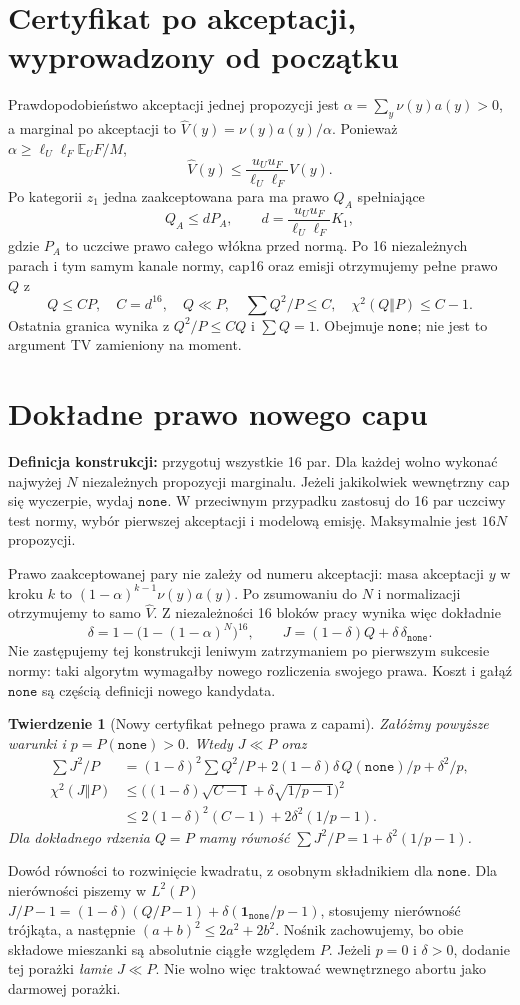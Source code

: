 \documentclass[11pt,a4paper]{article}
\newcommand{\none}{\mathtt{none}}
\newcommand{\E}{\mathbb E}
\newtheorem{theorem}{Twierdzenie}
\begin{document}
\section{Certyfikat po akceptacji, wyprowadzony od początku}
Prawdopodobieństwo akceptacji jednej propozycji jest
$\alpha=\sum_y\nu(y)a(y)>0$, a marginal po akceptacji to
$\widehat V(y)=\nu(y)a(y)/\alpha$.
Ponieważ $\alpha\ge\ell_U\ell_F\E_U F/M$,
\[
 \widehat V(y)\le\frac{u_Uu_F}{\ell_U\ell_F}V(y).
\]
Po kategorii $z_1$ jedna zaakceptowana para ma prawo $Q_A$ spełniające
\[
 Q_A\le dP_A,\qquad d=\frac{u_Uu_F}{\ell_U\ell_F}K_1,
\]
gdzie $P_A$ to uczciwe prawo całego włókna przed normą.
Po 16 niezależnych parach i tym samym kanale normy, cap16 oraz emisji
otrzymujemy pełne prawo $Q$ z
\[
 Q\le CP,\quad C=d^{16},\quad Q\ll P,\quad
 \sum Q^2/P\le C,\quad\chi^2(Q\Vert P)\le C-1.
\]
Ostatnia granica wynika z $Q^2/P\le CQ$ i $\sum Q=1$.
Obejmuje $\none$; nie jest to argument TV zamieniony na moment.

\section{Dokładne prawo nowego capu}
\textbf{Definicja konstrukcji:} przygotuj wszystkie 16 par. Dla każdej
wolno wykonać najwyżej $N$ niezależnych propozycji marginalu.
Jeżeli jakikolwiek wewnętrzny cap się wyczerpie, wydaj $\none$.
W przeciwnym przypadku zastosuj do 16 par uczciwy test normy, wybór
pierwszej akceptacji i modelową emisję. Maksymalnie jest $16N$ propozycji.

Prawo zaakceptowanej pary nie zależy od numeru akceptacji:
masa akceptacji $y$ w kroku $k$ to $(1-\alpha)^{k-1}\nu(y)a(y)$.
Po zsumowaniu do $N$ i normalizacji otrzymujemy to samo $\widehat V$.
Z niezależności 16 bloków pracy wynika więc dokładnie
\[
 \delta=1-\bigl(1-(1-\alpha)^N\bigr)^{16},\qquad
 J=(1-\delta)Q+\delta\,\delta_{\none}.
\]
Nie zastępujemy tej konstrukcji leniwym zatrzymaniem po pierwszym sukcesie
normy: taki algorytm wymagałby nowego rozliczenia swojego prawa.
Koszt i gałąź $\none$ są częścią definicji nowego kandydata.

\begin{theorem}[Nowy certyfikat pełnego prawa z capami]
Załóżmy powyższe warunki i $p=P(\none)>0$. Wtedy $J\ll P$ oraz
\begin{align*}
 \sum J^2/P
 &=(1-\delta)^2\sum Q^2/P
   +2(1-\delta)\delta\,Q(\none)/p+\delta^2/p,\\
 \chi^2(J\Vert P)
 &\le\bigl((1-\delta)\sqrt{C-1}+\delta\sqrt{1/p-1}\bigr)^2\\
 &\le2(1-\delta)^2(C-1)+2\delta^2(1/p-1).
\end{align*}
Dla dokładnego rdzenia $Q=P$ mamy równość
$\sum J^2/P=1+\delta^2(1/p-1)$.
\end{theorem}
Dowód równości to rozwinięcie kwadratu, z osobnym składnikiem dla $\none$.
Dla nierówności piszemy w $L^2(P)$
$J/P-1=(1-\delta)(Q/P-1)+\delta(\mathbf1_{\none}/p-1)$,
stosujemy nierówność trójkąta, a następnie $(a+b)^2\le2a^2+2b^2$.
Nośnik zachowujemy, bo obie składowe mieszanki są absolutnie ciągłe względem $P$.
Jeżeli $p=0$ i $\delta>0$, dodanie tej porażki \emph{łamie} $J\ll P$.
Nie wolno więc traktować wewnętrznego abortu jako darmowej porażki.
\end{document}
